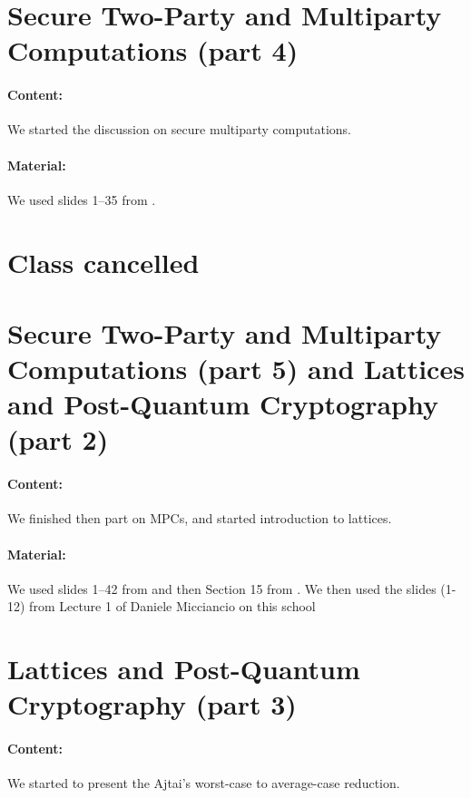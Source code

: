 \documentclass{llncs}
\begin{document}
\section{Secure Two-Party and Multiparty Computations (part 4)}


\paragraph{Content:} We started the discussion on secure multiparty computations. 
\paragraph{Material:} We used slides 1--35 from \cite{MPC}.


\section{Class cancelled}

\section{Secure Two-Party and Multiparty Computations (part 5) and Lattices and Post-Quantum Cryptography (part 2)}

\paragraph{Content:} We finished then part on MPCs, and started introduction to lattices. 

\paragraph{Material:} We used slides 1--42 from \cite{MPC} and then Section 15 from \cite{Cramer}. We then used the slides (1-12) from Lecture 1 of Daniele Micciancio on this school \cite{PQC}

\section{Lattices and Post-Quantum Cryptography (part 3)}

\paragraph{Content:} We started to present the Ajtai's worst-case to average-case reduction.
\end{document}
